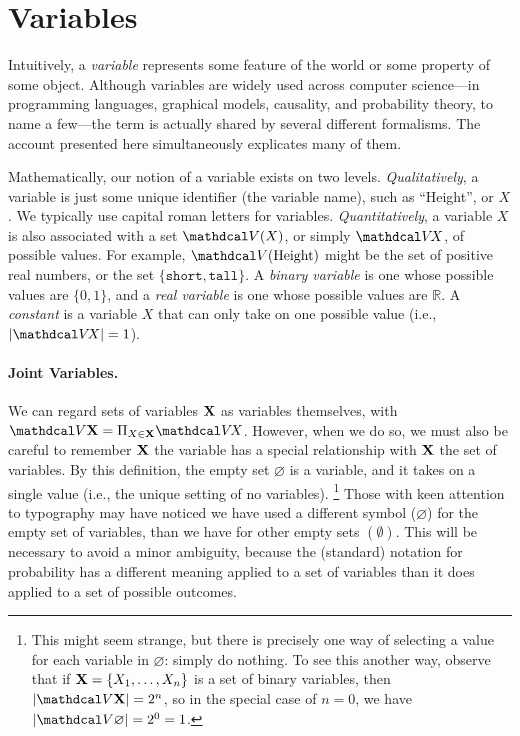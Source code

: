 \section{Variables}
    \label{ssec:basic-vars}
Intuitively, a \emph{variable} represents some feature of the world or some property of some object. 
Although variables are widely used across computer science---in programming languages, graphical models, causality, and probability theory, to name a few---the term is actually shared by several different formalisms. 
The account presented here simultaneously explicates many of them.

Mathematically, our notion of a variable exists on two levels.
\emph{Qualitatively}, a variable is just some unique identifier (the variable name), such as ``Height'', or $X$. 
We typically use capital roman letters for variables.
\emph{Quantitatively}, a variable $X$ is also associated with a set $\V(X)$, or simply $\V\!X$, of possible values. 
For example, $\V(\text{Height})$ might be the set of positive real numbers, 
    or the set $\{ \texttt{short}, \texttt{tall} \}$. 
A \emph{binary variable} is one whose possible values are $\{0, 1\}$, and a 
    \emph{real variable} is one whose possible values are $\mathbb R$. 
A \emph{constant} is a variable $X$ that can only take on one possible value (i.e., $|\V\! X| = 1$).

\paragraph{Joint Variables.}
We can regard sets of variables $\mathbf X$ as variables themselves, with
$\V \mat X = \Pi_{X \in \mat X} \V\! X$.
However, when we do so, we must also be careful to remember $\mathbf X$ the variable has a special relationship with $\mathbf X$ the set of variables. 
By this definition, the empty set $\varnothing$ is a variable, and it takes on a single value (i.e., the unique setting of no variables).%
\footnote{%
    This might seem strange, but there is precisely one way of selecting a value for each variable in $\varnothing$: simply do nothing. To see this another way, observe that if $\mathbf X = \{ X_1, \ldots, X_n \}$ is a set of binary variables,
    then $|\V\mat X| = 2^n$, so in the special case of $n=0$, we have $|\V \varnothing | = 2^0 = 1$. 
    }
Those with keen attention to typography may have noticed we have used a different symbol ($\varnothing$) for the empty set of variables, than we have for other empty sets $(\emptyset)$. 
This will be necessary to avoid a minor ambiguity, because the (standard) notation for probability has a different meaning applied to a set of variables than it does applied to a set of possible outcomes. 

